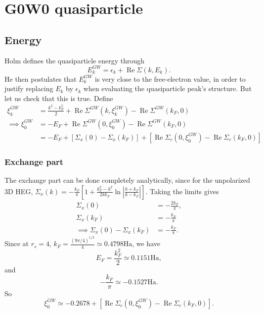 \section{G0W0 quasiparticle}
\subsection{Energy}
Holm defines the quasiparticle energy through
\begin{equation}
E_k^{G W}=\epsilon_k+\operatorname{Re} \Sigma\left(k, E_k\right).
\end{equation}
He then postulates that $E_k^{G W}$ is very close to the free-electron value, in order to justify replacing $E_k$ by $\epsilon_k$ when evaluating the quasiparticle peak's structure. But let us check that this is true. Define
\begin{align}
\xi_k^{G W}&=\frac{k^2-k_F^2}{2}+\operatorname{Re} \Sigma^{G W}\left(k, \xi_k^{G W}\right)-\operatorname{Re} \Sigma^{G W}\left(k_F, 0\right) \\
\implies \xi_0^{G W}&=-E_F+\operatorname{Re} \Sigma^{G W}\left(0, \xi_0^{G W}\right)-\operatorname{Re} \Sigma^{G W}\left(k_F, 0\right) \\
&=-E_F+\left[\Sigma_x(0)-\Sigma_x\left(k_F\right)\right]+\left[\operatorname{Re} \Sigma_c\left(0, \xi_0^{G W}\right)-\operatorname{Re} \Sigma_c\left(k_F, 0\right)\right]
\end{align}
\subsubsection{Exchange part}
The exchange part can be done completely analytically, since for the unpolarized 3D HEG, $\Sigma_x(k)=-\frac{k_F}{\pi}\left[1+\frac{k_F^2-k^2}{2 k k_F} \ln \left|\frac{k+k_F}{k-k_F}\right|\right]$. Taking the limits gives
\begin{align}
\Sigma_x(0)&=-\frac{2 k_F}{\pi}, \\
\Sigma_x\left(k_F\right)&=-\frac{k_F}{\pi}\\
\implies \Sigma_x(0)-\Sigma_x\left(k_F\right)&=-\frac{k_F}{\pi}.
\end{align}
Since at $r_s=4$, $k_F=\frac{(9 \pi / 4)^{1 / 3}}{4} \simeq 0.4798 \mathrm{Ha}$, we have
\begin{equation}
E_F=\frac{k_F^2}{2} \simeq 0.1151 \mathrm{Ha},
\end{equation}
and
\begin{equation}
-\frac{k_F}{\pi} \simeq-0.1527 \mathrm{Ha}.
\end{equation}
So
\begin{equation}
\xi_0^{G W}\simeq-0.2678+\left[\operatorname{Re} \Sigma_c\left(0, \xi_0^{G W}\right)-\operatorname{Re} \Sigma_c\left(k_F, 0\right)\right].
\end{equation}
